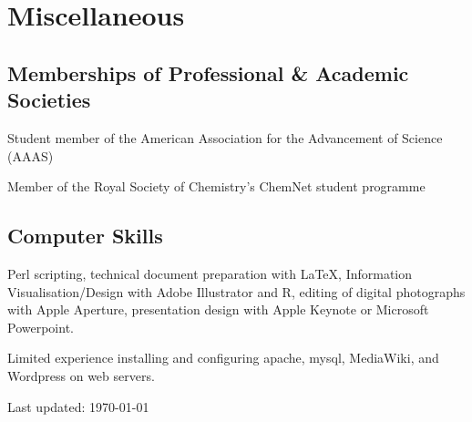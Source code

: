 \documentclass[letterpaper]{article}
\renewenvironment{itemize}{
  \begin{list}{}{
    \setlength{\leftmargin}{1.5em}
  }
}{
  \end{list}
}
\begin{document}



\section*{Miscellaneous}

\subsection*{Memberships of Professional \& Academic Societies}
\begin{itemize}
\item Student member of the American Association for the Advancement of Science (AAAS)
\item Member of the Royal Society of Chemistry's ChemNet student programme
\end{itemize}

\subsection*{Computer Skills}
Perl scripting, technical document preparation with \LaTeX, Information Visualisation/Design with Adobe Illustrator and R, editing of digital photographs with Apple Aperture, presentation design with Apple Keynote or Microsoft Powerpoint. 


Limited experience installing and configuring apache, mysql, MediaWiki, and Wordpress on web servers.




\bigskip

\begin{center}
\begin{footnotesize}
Last updated: \today \\
\end{footnotesize}
\end{center}
\end{document}
